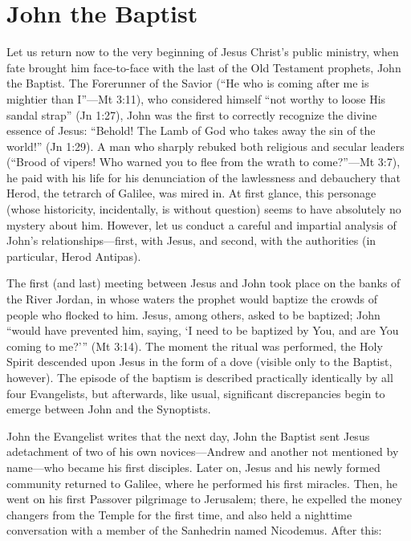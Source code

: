 \chapter*{John the Baptist}

Let us return now to the very beginning of Jesus Christ's public ministry, when fate brought him face-to-face with the last of the Old Testament prophets, John the Baptist. The Forerunner of the Savior (``He who is coming after me is mightier than I''---Mt 3:11), who considered himself ``not worthy to loose His sandal strap'' (Jn 1:27), John was the first to correctly recognize the divine essence of Jesus: ``Behold! The Lamb of God who takes away the sin of the world!'' (Jn 1:29). A man who sharply rebuked both religious and secular leaders (``Brood of vipers! Who warned you to flee from the wrath to come?''---Mt 3:7), he paid with his life for his denunciation of the lawlessness and debauchery that Herod, the tetrarch of Galilee, was mired in. At first glance, this personage (whose historicity, incidentally, is without question) seems to have absolutely no mystery about him. However, let us conduct a careful and impartial analysis of John's relationships---first, with Jesus, and second, with the authorities (in particular, Herod Antipas).

The first (and last) meeting between Jesus and John took place on the banks of the River Jordan, in whose waters the prophet would baptize the crowds of people who flocked to him. Jesus, among others, asked to be baptized; John ``would have prevented him, saying, `I need to be baptized by You, and are You coming to me?''' (Mt 3:14). The moment the ritual was performed, the Holy Spirit descended upon Jesus in the form of a dove (visible only to the Baptist, however). The episode of the baptism is described practically identically by all four Evangelists, but afterwards, like usual, significant discrepancies begin to emerge between John and the Synoptists.

John the Evangelist writes that the next day, John the Baptist sent Jesus adetachment of two of his own novices---Andrew and another not mentioned by name---who became his first disciples. Later on, Jesus and his newly formed community returned to Galilee, where he performed his first miracles. Then, he went on his first Passover pilgrimage to Jerusalem; there, he expelled the money changers from the Temple for the first time, and also held a nighttime conversation with a member of the Sanhedrin named Nicodemus. After this:

